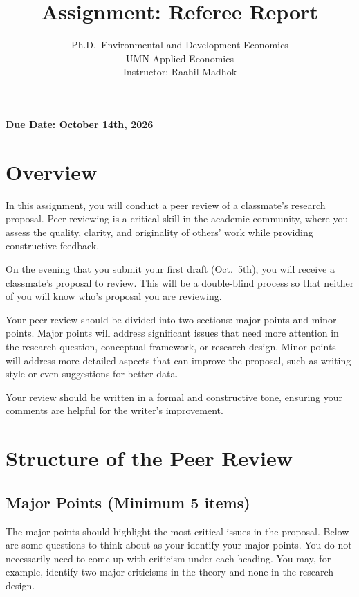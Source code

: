 \documentclass[
]{article}
\title{Assignment: Referee Report}
\subtitle{Ph.D.~Environmental and Development Economics\\
UMN Applied Economics\\
Instructor: Raahil Madhok}
\author{}
\date{\vspace{-2.5em}}
\begin{document}
\maketitle

\textbf{Due Date: October 14th, 2026}

\hypertarget{overview}{%
\section{Overview}\label{overview}}

In this assignment, you will conduct a peer review of a classmate's research proposal. Peer reviewing is a critical skill in the academic community, where you assess the quality, clarity, and originality of others' work while providing constructive feedback.

On the evening that you submit your first draft (Oct.~5th), you will receive a classmate's proposal to review. This will be a double-blind process so that neither of you will know who's proposal you are reviewing.

Your peer review should be divided into two sections: major points and minor points. Major points will address significant issues that need more attention in the research question, conceptual framework, or research design. Minor points will address more detailed aspects that can improve the proposal, such as writing style or even suggestions for better data.

Your review should be written in a formal and constructive tone, ensuring your comments are helpful for the writer's improvement.

\hypertarget{structure-of-the-peer-review}{%
\section{Structure of the Peer Review}\label{structure-of-the-peer-review}}

\hypertarget{major-points-minimum-5-items}{%
\subsection{Major Points (Minimum 5 items)}\label{major-points-minimum-5-items}}

The major points should highlight the most critical issues in the proposal. Below are some questions to think about as your identify your major points. You do not necessarily need to come up with criticism under each heading. You may, for example, identify two major criticisms in the theory and none in the research design.
\end{document}
